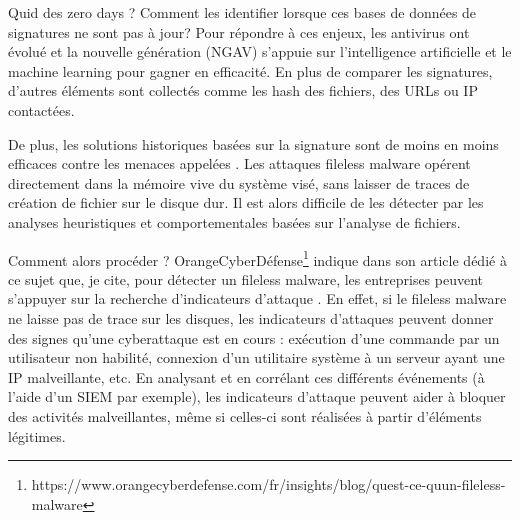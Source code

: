 
Quid des zero days ? Comment les identifier lorsque ces bases de données de signatures ne sont pas à jour?
Pour répondre à ces enjeux, les antivirus ont évolué et la nouvelle génération (NGAV) s'appuie sur l'intelligence artificielle et le machine learning pour gagner en efficacité. En plus de comparer les signatures, d'autres éléments sont collectés comme les hash des fichiers, des URLs ou IP contactées.

De plus, les solutions historiques basées sur la signature sont de moins en moins efficaces contre les menaces appelées . Les attaques fileless malware opérent directement dans la mémoire vive du système visé, sans laisser de traces de création de fichier sur le disque dur. Il est alors difficile de les détecter par les analyses heuristiques et comportementales basées sur l'analyse de fichiers.

Comment alors procéder ?
OrangeCyberDéfense\footnote{https://www.orangecyberdefense.com/fr/insights/blog/quest-ce-quun-fileless-malware} indique dans son article dédié à ce sujet que, je cite, pour détecter un fileless malware, les entreprises peuvent s’appuyer sur la recherche d’indicateurs d’attaque . En effet, si le fileless malware ne laisse pas de trace sur les disques, les indicateurs d’attaques peuvent donner des signes qu’une cyberattaque est en cours : exécution d’une commande par un utilisateur non habilité, connexion d’un utilitaire système à un serveur ayant une IP malveillante, etc. En analysant et en corrélant ces différents événements (à l'aide d'un SIEM par exemple), les indicateurs d’attaque peuvent aider à bloquer des activités malveillantes, même si celles-ci sont réalisées à partir d’éléments légitimes.

